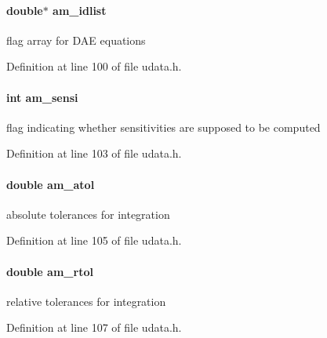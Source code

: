 \paragraph[{am\+\_\+idlist}]{\setlength{\rightskip}{0pt plus 5cm}double$\ast$ am\+\_\+idlist}\label{struct_user_data_ab62bd78b1593ddbf3d854356b4dcaa0f}
flag array for D\+A\+E equations 

Definition at line 100 of file udata.\+h.

\hypertarget{struct_user_data_a3bd631d595b8a864de83f25a1756ce3d}{}
\paragraph[{am\+\_\+sensi}]{\setlength{\rightskip}{0pt plus 5cm}int am\+\_\+sensi}\label{struct_user_data_a3bd631d595b8a864de83f25a1756ce3d}
flag indicating whether sensitivities are supposed to be computed 

Definition at line 103 of file udata.\+h.

\hypertarget{struct_user_data_a2aade90998d7e2cefa7953d4fdbc438b}{}
\paragraph[{am\+\_\+atol}]{\setlength{\rightskip}{0pt plus 5cm}double am\+\_\+atol}\label{struct_user_data_a2aade90998d7e2cefa7953d4fdbc438b}
absolute tolerances for integration 

Definition at line 105 of file udata.\+h.

\hypertarget{struct_user_data_a2370b78f280747d84a69619ea8c55985}{}
\paragraph[{am\+\_\+rtol}]{\setlength{\rightskip}{0pt plus 5cm}double am\+\_\+rtol}\label{struct_user_data_a2370b78f280747d84a69619ea8c55985}
relative tolerances for integration 

Definition at line 107 of file udata.\+h.

\hypertarget{struct_user_data_a0187950731c16f2857d0cd5b92416352}{}

